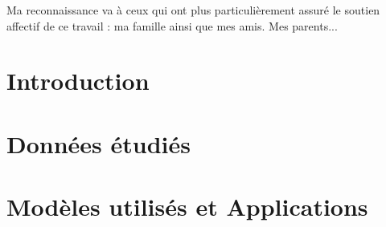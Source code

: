 \documentclass[a4paper, oneside, 12pt, final]{extreport}
\newcommand{\studyDepartment} {%
  Entreprise d'accueil %
}
\newcommand{\juryPresident} {%
  Mr Ben Foulen \textsc{Foulenia}%
}
\newcommand{\juryMemberOne} {%
  Ms Ben Foulena \textsc{Foulen}%
}
\newcommand{\juryMemberTwo} {%
  Mr Ben Foulen \textsc{Fouleni}%
}
\newcommand{\juryMemberThree} {%
	M. Ben Foulen \textsc{Fouleni}%
}
\begin{document}


Ma reconnaissance va à ceux qui ont plus particulièrement assuré le soutien affectif de ce travail : ma famille ainsi que mes amis. Mes parents... 




\tableofcontents

\listoffigures
\listoftables
\listofalgorithms
{}
\cleardoublepage

\newpage
{}
\chapter*{Introduction}
\label{chap:general_intorduction}



\chapter{Données étudiés}%
\label{chap:chapterone}


\chapter{Modèles utilisés et Applications}
\label{chap:2}

\end{document}
